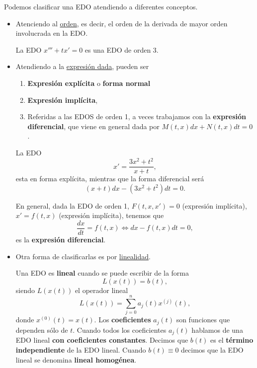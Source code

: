Podemos clasificar una EDO atendiendo a diferentes conceptos.
\begin{itemize}
	\item Atenciendo al \underline{orden}, es decir, el orden de la derivada de mayor orden involucrada en la EDO. 
	\begin{eg}
	La EDO $\displaystyle x''' +tx' = 0 $ es una EDO de orden 3.
	\end{eg}
\item Atendiendo a la \underline{expresión dada}, pueden ser
	\begin{enumerate}
	\item \textbf{Expresión explícita} o \textbf{forma normal} 
	\item \textbf{Expresión implícita},
	\item Referidas a las EDOS de orden 1, a veces trabajamos con la \textbf{expresión diferencial}, que viene en general dada por $\displaystyle M\left(t,x\right)dx + N\left(t,x\right)dt = 0 $. 
	\end{enumerate}
	\begin{eg}
	La EDO
	\[x' = \frac{3x^{2}+t ^{2}}{x + t} ,\]
	esta en forma explícita, mientras que la forma diferencial será
	\[\left(x+t\right)dx-\left(3x^{2}+t ^{2}\right) dt = 0 .\]
	\end{eg}
	En general, dada la EDO de orden 1, $\displaystyle F\left(t,x,x'\right) = 0 $ (expresión implícita), $\displaystyle x' = f\left(t,x\right) $ (expresión implícita), tenemos que
		\[\frac{dx}{dt}=f\left(t,x\right) \iff dx - f\left(t,x\right)dt = 0 ,\]
		es la \textbf{expresión diferencial}.
	\item Otra forma de clasificarlas es por \underline{linealidad}. 
	\begin{definition}
	Una EDO es \textbf{lineal} cuando se puede escribir de la forma
	\[L\left(x\left(t\right)\right) = b\left(t\right) ,\]
	siendo $\displaystyle L\left(x\left(t\right)\right) $ el operador lineal 
	\[L\left(x\left(t\right)\right) = \sum^{n}_{j = 0}a_{j}\left(t\right)x^{\left(j\right)}\left(t\right),\]
	donde $\displaystyle x^{\left(0\right)}\left(t\right) = x\left(t\right) $. Los \textbf{coeficientes} $\displaystyle a_{j}\left(t\right) $ son funciones que dependen sólo de $\displaystyle t $. Cuando todos los coeficientes $\displaystyle a_{j}\left(t\right) $ hablamos de una EDO lineal \textbf{con coeficientes constantes}.
	Decimos que $\displaystyle b\left(t\right) $ es el \textbf{término independiente} de la EDO lineal. Cuando $\displaystyle b\left(t\right)\equiv 0 $ decimos que la EDO lineal se denomina \textbf{lineal homogénea}. 

\end{definition}
\end{itemize}
